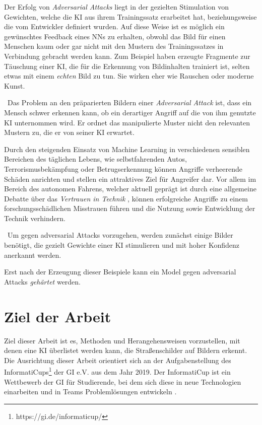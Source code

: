 Der Erfolg von \textit{Adversarial Attacks} liegt in der gezielten Stimulation von Gewichten, welche die \ac{KI} aus ihrem Trainingssatz erarbeitet hat, beziehungsweise die vom Entwickler definiert wurden. 
Auf diese Weise ist es möglich ein gewünschtes Feedback eines \acs{NN}s zu erhalten, obwohl das Bild für einen Menschen kaum oder gar nicht mit den Mustern des Trainingssatzes in Verbindung gebracht werden kann. 
Zum Beispiel haben erzeugte Fragmente zur Täuschung einer \ac{KI}, die für die Erkennung von Bildinhalten trainiert ist, selten etwas mit einem \textit{echten} Bild zu tun. Sie wirken eher wie Rauschen oder moderne Kunst. 

~\newline Das Problem an den präparierten Bildern einer \textit{Adversarial Attack} ist, dass ein Mensch schwer erkennen kann, ob ein derartiger Angriff auf die von ihm genutzte \ac{KI} unternommen wird. Er ordnet das manipulierte Muster nicht den relevanten Mustern zu, die er von seiner \ac{KI} erwartet.

Durch den steigenden Einsatz von Machine Learning in verschiedenen sensiblen Bereichen des täglichen Lebens, wie selbstfahrenden Autos, Terrorismusbekämpfung oder Betrugserkennung können Angriffe verheerende Schäden anrichten und stellen ein attraktives Ziel für Angreifer dar. 
Vor allem im Bereich des autonomen Fahrens, welcher aktuell geprägt ist durch eine allgemeine Debatte über das \textit{Vertrauen in Technik} \cite{VertrauenTechnik}, können erfolgreiche Angriffe zu einem forschungsschädlichen Misstrauen führen und die Nutzung sowie Entwicklung der Technik verhindern. 

~\newline Um gegen adversarial Attacks vorzugehen, werden zunächst einige Bilder benötigt, die gezielt Gewichte einer \ac{KI} stimulieren und mit hoher Konfidenz anerkannt werden.

Erst nach der Erzeugung dieser Beispiele kann ein Model gegen adversarial Attacks \textit{gehärtet} werden.

\section{Ziel der Arbeit}
\label{sec:ZielDerArbeit}
Ziel dieser Arbeit ist es, Methoden und Herangehensweisen vorzustellen, mit denen eine \ac{KI} überlistet werden kann, die Straßenschilder auf Bildern erkennt. 
Die Ausrichtung dieser Arbeit orientiert sich an der Aufgabenstellung des InformatiCups\footnote{https://gi.de/informaticup/} der \ac{GI} e.V. aus dem Jahr 2019. Der InformatiCup ist ein Wettbewerb der \ac{GI} für Studierende, bei dem sich diese in neue Technologien einarbeiten und in Teams Problemlösungen entwickeln \cite{gesellschaft_fur_informatik_e.v._informaticup2019-irrbilder.pdf_2018}.

